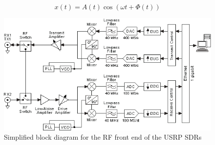 \begin{equation} \label{eq:realSampling}
    x\left(t\right) = A\left(t\right)\cos\left(\omega t + \Phi \left(t\right)\right)
\end{equation}

\begin{figure}[h]
    \begin{centering}
        \includegraphics[width=13cm,keepaspectratio]{Figures/2920_simplified_system_diagram.png}
        \caption{Simplified block diagram for the RF front end of the USRP SDRs}
    \label{fig:USRPBlock}
    \end{centering}
\end{figure}
